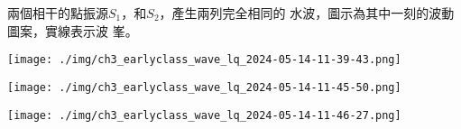 {
    兩個相干的點振源$S_1$，和$S_2$，產生兩列完全相同的 水波，圖示為其中一刻的波動圖案，實線表示波 峯。
    \par{\par\centering\texttt{[image: ./img/ch3\_earlyclass\_wave\_lq\_2024-05-14-11-39-43.png]}\par}

}{
    \sol
    \par{\par\centering\texttt{[image: ./img/ch3\_earlyclass\_wave\_lq\_2024-05-14-11-45-50.png]}\par}
    \par{\par\centering\texttt{[image: ./img/ch3\_earlyclass\_wave\_lq\_2024-05-14-11-46-27.png]}\par}
}

